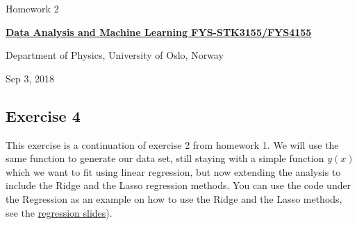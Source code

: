 \documentclass[%
oneside,                 %
final,                   %
10pt]{article}
\begin{document}

\newcommand{\exercisesection}[1]{\subsection*{#1}}






\thispagestyle{empty}

\begin{center}
{\LARGE\bf
\begin{spacing}{1.25}
Homework 2
\end{spacing}
}
\end{center}


\begin{center}
{\bf \href{{http://www.uio.no/studier/emner/matnat/fys/FYS3155/index-eng.html}}{Data Analysis and Machine Learning FYS-STK3155/FYS4155}}
\end{center}

    \begin{center}
\centerline{{\small Department of Physics, University of Oslo, Norway}}
\end{center}
    

\begin{center}
Sep 3, 2018
\end{center}

\vspace{1cm}


\subsection{Exercise 4}

This exercise is a continuation of exercise 2 from homework 1. We will
use the same function to generate our data set, still staying with a
simple function $y(x)$ which we want to fit using linear regression,
but now extending the analysis to include the Ridge and the Lasso
regression methods. You can use the code under the Regression as an example on how to use the Ridge and the Lasso methods, see the \href{{https://compphysics.github.io/MachineLearning/doc/pub/Regression/html/Regression-bs.html}}{regression slides}). 
\end{document}
